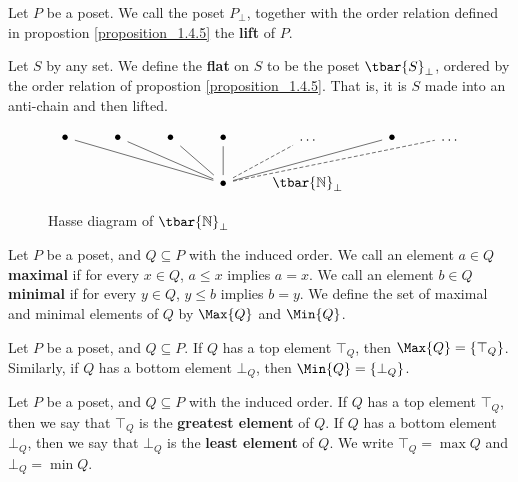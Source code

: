 \begin{definition}
  Let $P$ be a poset. We call the poset  $P_\bot$, together with the
  order relation defined in propostion \ref{proposition_1.4.5} the
  \textbf{lift} of $P$.
\end{definition}

\begin{definition}
  Let $S$ by any set. We define the \textbf{flat} on $S$ to be the
  poset $\tbar{S}_\bot$, ordered by the order relation of propostion
  \ref{proposition_1.4.5}. That is, it is $S$ made into an anti-chain
  and then lifted.
\end{definition}

\begin{figure}[h]
  \centering
  \[\begin{tikzcd}
    \bullet & \bullet & \bullet & \bullet & \dots & \bullet & \dots \\
            &&& \bullet & {\tbar{\N}_\bot}
            \arrow[no head, from=2-4, to=1-1]
            \arrow[no head, from=2-4, to=1-2]
            \arrow[no head, from=2-4, to=1-3]
            \arrow[no head, from=2-4, to=1-4]
            \arrow[dashed, no head, from=2-4, to=1-5]
            \arrow[draw=none, from=2-4, to=1-6]
            \arrow[no head, from=2-4, to=1-6]
            \arrow[dashed, no head, from=2-4, to=1-7]
  \end{tikzcd}\]
  \caption{Hasse diagram of $\tbar{\N}_\bot$}
  \label{figure_1.3}
\end{figure}

\begin{definition}
  Let $P$ be a poset, and $Q \subseteq P$ with the induced order. We
  call an element $a \in Q$  \textbf{maximal} if for every $x \in Q$,
  $a \leq x$ implies $a=x$. We call an element $b \in Q$
  \textbf{minimal} if for every $y \in Q$, $y \leq b$ implies $b=y$.
  We define the set of maximal and minimal elements of $Q$ by
  $\Max{Q}$ and $\Min{Q}$.
\end{definition}

\begin{lemma}\label{lemma_1.4.6}
  Let $P$ be a poset, and  $Q \subseteq P$. If $Q$ has a top element
  $\top_Q$, then $\Max{Q}=\{\top_Q\}$. Similarly, if $Q$ has a bottom
  element $\bot_Q$, then $\Min{Q}=\{\bot_Q\}$.
\end{lemma}

\begin{definition}
  Let $P$ be a poset, and $Q \subseteq P$ with the induced order. If
  $Q$ has a top element $\top_Q$, then we say that $\top_Q$ is the
  \textbf{greatest element} of $Q$. If $Q$ has a bottom element
  $\bot_Q$, then we say that $\bot_Q$ is the \textbf{least element} of
  $Q$. We write $\top_Q=\max{Q}$ and $\bot_Q=\min{Q}$.
\end{definition}

